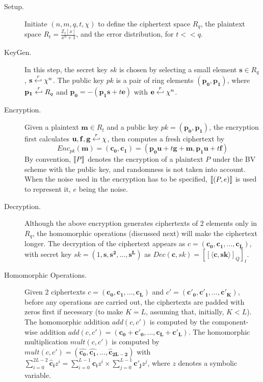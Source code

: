 \begin{description}
\item[Setup.] Initiate $(n,m,q,t, \chi)$ to define the ciphertext space $R_q$,
  the plaintext space $R_t = \frac{\mathbb{Z}_{t}[x]}{x^{n} + 1}$, and the error
  distribution, for \(t << q\).
\item[KeyGen.] In this step, the secret key $sk$ is chosen by selecting a small element
  $\mathbf{s} \in R_{q}$, $\mathbf{s} \stackrel{r}{\hookleftarrow} \chi^{n}$. The public key $pk$ is a pair of ring elements
  $(\mathbf{p_0},\mathbf{p_1})$, where $\mathbf{p_1} \stackrel{r}{\hookleftarrow} R_q$ and
  $\mathbf{p_0} = -(\mathbf{p_1}\mathbf{s} + t\mathbf{e})$ with
  $\mathbf{e} \stackrel{r}{\hookleftarrow} \chi^{n}$.
\item[Encryption.] Given a plaintext $\mathbf{m} \in R_t$ and a public key
  $pk=(\mathbf{p_0},\mathbf{p_1})$, the encryption first calculates
  $\mathbf{u},\mathbf{f},\mathbf{g} \stackrel{r}{\hookleftarrow} \chi$, then computes a fresh
  ciphertext by
    \[
      Enc_{pk}(\mathbf{m}) = (\mathbf{c_0},\mathbf{c_1}) =
      (\mathbf{p_0}\mathbf{u} + t\mathbf{g} + \mathbf{m},
      \mathbf{p_1}\mathbf{u} + t\mathbf{f})
    \]
    By convention, $\left\llbracket P\right\rrbracket$ denotes the encryption of a plaintext $P$ under the
    BV scheme with the public key, and randomness is not taken into
    account. When the noise used in the encryption has to be specified,
    $\left\llbracket(P,e)\right\rrbracket$ is used to represent it, $e$ being the noise.
  \item[Decryption.] Although the above encryption generates ciphertexts of 2
    elements only in $R_q$, the homomorphic operations (discussed next) will
    make the ciphertext longer. The decryption of the ciphertext appears as
    $c=(\mathbf{c_0},\mathbf{c_1},\dots,\mathbf{c_L})$, with secret key
    $sk = (1, \mathbf{s}, \mathbf{s^2},\dots, \mathbf{s^L})$ as
    $ Dec(\mathbf{c},sk) = \left[\left[ \langle \mathbf{c}, \mathbf{sk} \rangle
      \right]_Q \right]_t $.
  \item[Homomorphic Operations.] Given 2 ciphertexts
    $c = (\mathbf{c_0},\mathbf{c_1},\dots,\mathbf{c_L})$ and
    $c' = (\mathbf{c'_0},\mathbf{c'_1},\dots,\mathbf{c'_{K}})$, before any
    operations are carried out, the ciphertexts are padded with zeros first if
    necessary (to make $K = L$, assuming that, initially, $K < L$).  The
    homomorphic addition $add(c,c')$ is computed by the component-wise addition
    $add(c,c') = (\mathbf{c_0} +\mathbf{c'_0}, \dots,
    \mathbf{c_L}+\mathbf{c'_L})$. The homomorphic multiplication $mult(c,c')$ is
    computed by
    $mult(c,c') = (\mathbf{\hat{c_0}}, \mathbf{\hat{c_1}}, \dots,
    \mathbf{\hat{c}_{2L-2}})$ with
    $ \sum_{i=0}^{2L-2}\mathbf{\hat{c}_i}z^i = \sum_{i=0}^{L-1}\mathbf{c_i}z^i
    \times \sum_{j=0}^{L-1}\mathbf{c'_j}z^j $, where $z$ denotes a symbolic
    variable.
\end{description}

